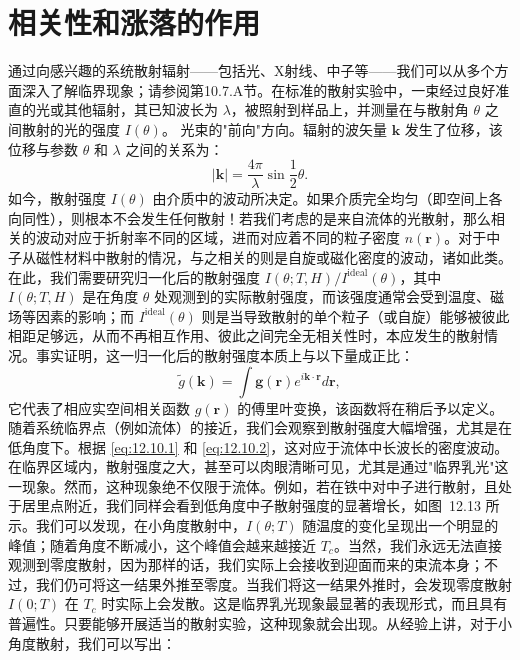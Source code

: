 \section{相关性和涨落的作用}\label{ux76f8ux5173ux6027ux548cux6da8ux843dux7684ux4f5cux7528}
通过向感兴趣的系统散射辐射——包括光、X射线、中子等——我们可以从多个方面深入了解临界现象；请参阅第10.7.A节。在标准的散射实验中，一束经过良好准直的光或其他辐射，其已知波长为 \(\lambda\)，被照射到样品上，并测量在与散射角 \(\theta\) 之间散射的光的强度 \(I(\theta)\)。
光束的"前向"方向。辐射的波矢量 \(\mathbf{k}\) 发生了位移，该位移与参数 \(\theta\) 和 \(\lambda\) 之间的关系为：
\begin{equation}\tag{12.11.1}\label{eq:12.11.1}
| \pmb { k } | = \frac { 4 \pi } { \lambda } \sin \frac { 1 } { 2 } \theta .
\end{equation}
如今，散射强度 \(I(\theta)\) 由介质中的波动所决定。如果介质完全均匀（即空间上各向同性），则根本不会发生任何散射！若我们考虑的是来自流体的光散射，那么相关的波动对应于折射率不同的区域，进而对应着不同的粒子密度 \(n(\mathbf{r})\)。对于中子从磁性材料中散射的情况，与之相关的则是自旋或磁化密度的波动，诸如此类。在此，我们需要研究归一化后的散射强度 \(I(\theta;T,H)/I^{\mathrm{ideal}}(\theta)\)，其中 \(I(\theta;T,H)\) 是在角度 \(\theta\) 处观测到的实际散射强度，而该强度通常会受到温度、磁场等因素的影响；而 \(I^{\mathrm{ideal}}(\theta)\) 则是当导致散射的单个粒子（或自旋）能够被彼此相距足够远，从而不再相互作用、彼此之间完全无相关性时，本应发生的散射情况。事实证明，这一归一化后的散射强度本质上与以下量成正比：
\begin{equation}\tag{12.11.2}\label{eq:12.11.2}
\tilde { g } ( \boldsymbol { k } ) = \int \boldsymbol { g } ( \boldsymbol { r } ) e ^{i \boldsymbol { k} \cdot \boldsymbol { r } } d \boldsymbol { r } ,
\end{equation}
它代表了相应实空间相关函数 \(g(\boldsymbol{r})\) 的傅里叶变换，该函数将在稍后予以定义。
随着系统临界点（例如流体）的接近，我们会观察到散射强度大幅增强，尤其是在低角度下。根据 \autoref{eq:12.10.1} 和 \autoref{eq:12.10.2}，这对应于流体中长波长的密度波动。在临界区域内，散射强度之大，甚至可以肉眼清晰可见，尤其是通过"临界乳光"这一现象。然而，这种现象绝不仅限于流体。例如，若在铁中对中子进行散射，且处于居里点附近，我们同样会看到低角度中子散射强度的显著增长，如图~12.13 所示。我们可以发现，在小角度散射中，\(I(\theta;T)\) 随温度的变化呈现出一个明显的峰值；随着角度不断减小，这个峰值会越来越接近 \(T_c\)。当然，我们永远无法直接观测到零度散射，因为那样的话，我们实际上会接收到迎面而来的束流本身；不过，我们仍可将这一结果外推至零度。当我们将这一结果外推时，会发现零度散射 \(I(0;T)\) 在 \(T_c\) 时实际上会发散。这是临界乳光现象最显著的表现形式，而且具有普遍性。只要能够开展适当的散射实验，这种现象就会出现。从经验上讲，对于小角度散射，我们可以写出：
